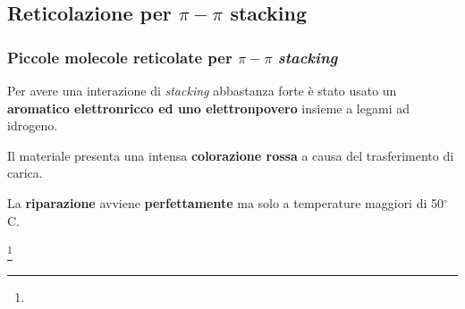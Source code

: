 \subsection{Reticolazione per $\pi-\pi$ stacking}
\begin{frame}\frametitle{Piccole molecole reticolate per  $\pi-\pi$ \emph{stacking}}

Per avere una interazione di \emph{stacking} abbastanza forte è stato usato un \textbf{aromatico elettronricco ed uno elettronpovero} insieme a legami ad idrogeno.

Il materiale presenta una intensa \textbf{colorazione rossa} a causa del trasferimento di carica. 

La \textbf{riparazione} avviene \textbf{perfettamente} ma solo a temperature maggiori di 50$^\circ$C.

\begin{figure}{}\end{figure}\vspace{-10pt}
\footnote{\tiny \leading{5pt} }
\end{frame}




